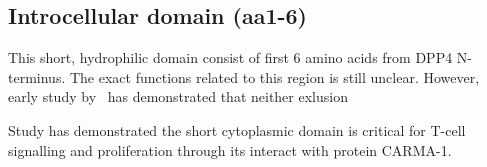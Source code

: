 \subsection{Introcellular domain (aa1-6)}

This short, hydrophilic domain consist of first 6 amino acids from DPP4 N-terminus. The exact functions related to this region is still unclear. However, early study by~\citet{Hong1990} has demonstrated that neither exlusion 

Study has demonstrated the short cytoplasmic domain is critical for T-cell signalling and proliferation through its interact with protein CARMA-1. \cite{Ohnuma_2007}